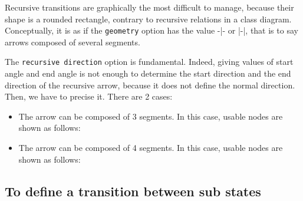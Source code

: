 \documentclass[a4paper,11pt]{report}
\begin{document}
Recursive transitions are graphically the most difficult to manage, because their shape is a rounded rectangle, contrary to recursive relations in a class diagram. Conceptually, it is as if the {\tt geometry} option has the value -|- or |-|, that is to say arrows composed of several segments.

\medskip

\begin{minipage}{0.51\textwidth}
	
\end{minipage}
\begin{minipage}{0.49\textwidth}
	\begin{center}
	\end{center}
\end{minipage}

\medskip

The {\tt recursive direction} option is fundamental. Indeed, giving values of start angle and end angle is not enough to determine the start direction and the end direction of the recursive arrow, because it does not define the normal direction. Then, we have to precise it. There are 2 cases:

\medskip

\begin{itemize}
	\item The arrow can be composed of 3 segments. In this case, usable nodes are shown as follows:
	      \vspace{-0.5cm}
	      \begin{center}
	      \end{center}
	      \vspace{-0.5cm}

	\item The arrow can be composed of 4 segments. In this case, usable nodes are shown as follows:
	      \vspace{-0.1cm}
	      \begin{center}
	      \end{center}
	      \vspace{-4cm}

\end{itemize}

\subsection{To define a transition between sub states}\label{ss.substatetrans}
\end{document}
